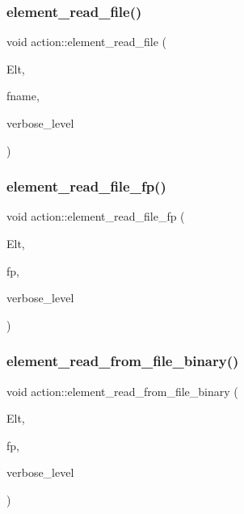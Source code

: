 \subsubsection{\texorpdfstring{element\+\_\+read\+\_\+file()}{element\_read\_file()}}
{\footnotesize\ttfamily void action\+::element\+\_\+read\+\_\+file (\begin{DoxyParamCaption}\item[{\mbox{\hyperlink{galois_8h_a09fddde158a3a20bd2dcadb609de11dc}{I\+NT}} $\ast$}]{Elt,  }\item[{const \mbox{\hyperlink{galois_8h_ab6cc7b4aeb6ea31aba2b3fbfc83ff5e6}{B\+Y\+TE}} $\ast$}]{fname,  }\item[{\mbox{\hyperlink{galois_8h_a09fddde158a3a20bd2dcadb609de11dc}{I\+NT}}}]{verbose\+\_\+level }\end{DoxyParamCaption})}

\mbox{\label{classaction_a5cff4d93d067b68e4ecf2d8502d697bb}} 
\subsubsection{\texorpdfstring{element\+\_\+read\+\_\+file\+\_\+fp()}{element\_read\_file\_fp()}}
{\footnotesize\ttfamily void action\+::element\+\_\+read\+\_\+file\+\_\+fp (\begin{DoxyParamCaption}\item[{\mbox{\hyperlink{galois_8h_a09fddde158a3a20bd2dcadb609de11dc}{I\+NT}} $\ast$}]{Elt,  }\item[{F\+I\+LE $\ast$}]{fp,  }\item[{\mbox{\hyperlink{galois_8h_a09fddde158a3a20bd2dcadb609de11dc}{I\+NT}}}]{verbose\+\_\+level }\end{DoxyParamCaption})}

\mbox{\label{classaction_abf2f35c0490a94c599c9472fb2c256eb}} 
\subsubsection{\texorpdfstring{element\+\_\+read\+\_\+from\+\_\+file\+\_\+binary()}{element\_read\_from\_file\_binary()}}
{\footnotesize\ttfamily void action\+::element\+\_\+read\+\_\+from\+\_\+file\+\_\+binary (\begin{DoxyParamCaption}\item[{\mbox{\hyperlink{galois_8h_a09fddde158a3a20bd2dcadb609de11dc}{I\+NT}} $\ast$}]{Elt,  }\item[{ifstream \&}]{fp,  }\item[{\mbox{\hyperlink{galois_8h_a09fddde158a3a20bd2dcadb609de11dc}{I\+NT}}}]{verbose\+\_\+level }\end{DoxyParamCaption})}

